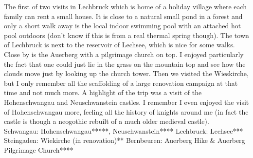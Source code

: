 
The first of two visits in Lechbruck which is home of a holiday village where each family can rent a small house. It is close to a natural small pond in a forest and only a short walk away is the local indoor swimming pool with an attached hot pool outdoors (don't know if this is from a real thermal spring though). The town of Lechbruck is next to the reservoir of Lechsee, which is nice for some walks. Close by is the Auerberg with a pilgrimage church on top. I enjoyed particularly the fact that one could just lie in the grass on the mountain top and see how the clouds move just by looking up the church tower. Then we visited the Wieskirche, but I only remember all the scaffolding of a large renovation campaign at that time and not much more. A highlight of the trip was a visit of the Hohenschwangau and Neuschwanstein castles. I remember I even enjoyed the visit of Hohenschwangau more, feeling all the history of knights around me (in fact the castle is though a neogothic rebuilt of a much older medieval castle).\\

Schwangau: Hohenschwangau*****, Neuschwanstein****
Lechbruck: Lechsee***
Steingaden: Wiekirche (in renovation)**
Bernbeuren: Auerberg Hike \& Auerberg Pilgrimage Church****